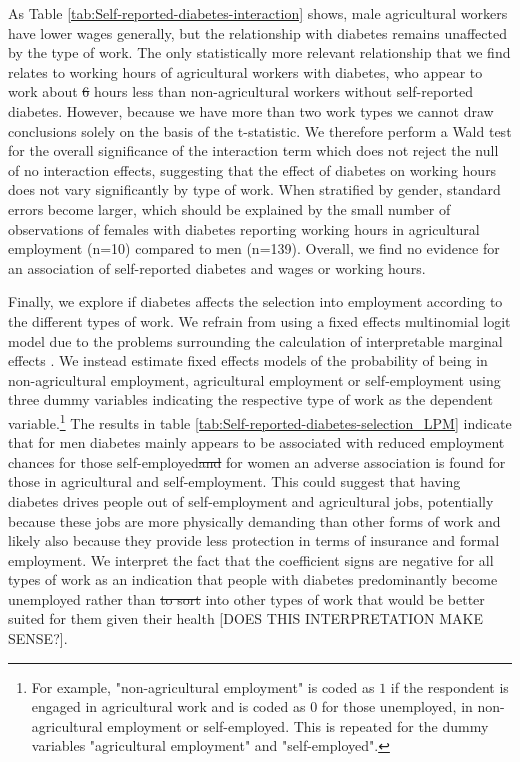 \documentclass[12pt,english,british]{article}
\providecommand{\DIFaddtex}[1]{{\protect\color{blue}\uwave{#1}}} %
\providecommand{\DIFdeltex}[1]{{\protect\color{red}\sout{#1}}}                      %
\providecommand{\DIFaddbegin}{} %
\providecommand{\DIFaddend}{} %
\providecommand{\DIFdelbegin}{} %
\providecommand{\DIFdelend}{} %
\providecommand{\DIFadd}[1]{\texorpdfstring{\DIFaddtex{#1}}{#1}} %
\providecommand{\DIFdel}[1]{\texorpdfstring{\DIFdeltex{#1}}{}} %
\begin{document}
As Table \ref{tab:Self-reported-diabetes-interaction} shows, male
agricultural workers have lower wages generally, but the relationship
with diabetes remains unaffected by the type of work. The only
statistically more relevant relationship that we find relates to working
hours of agricultural workers with diabetes, who appear to work about
\DIFdelbegin \DIFdel{6 }\DIFdelend \DIFaddbegin \DIFadd{five }\DIFaddend hours less than non-agricultural workers without self-reported diabetes.
However, because we have more than two work types we cannot draw conclusions
solely on the basis of the t-statistic. We therefore perform a Wald
test for the overall significance of the interaction term which does
not reject the null of no interaction effects, suggesting that the
effect of diabetes on working hours does not vary significantly by type of work.
When stratified by gender, standard errors become larger, which should
be explained by the small number of observations of females with diabetes
reporting working hours in agricultural employment (n=10) compared
to men (n=139). Overall, we find no evidence for an association of
self-reported diabetes and wages or working hours.

Finally, we explore if diabetes affects the selection into employment according to the different types of work. We refrain from using a fixed effects multinomial logit model due to the problems surrounding the calculation of interpretable marginal effects \citep{Pforr2014}. We instead estimate fixed effects models of the probability of being in non-agricultural employment, agricultural employment or self-employment using three dummy variables indicating the respective type of work as the dependent variable.\footnote{For example, "non-agricultural employment" is coded as $1$ if the respondent is engaged in agricultural work and is coded as $0$ for those unemployed, in non-agricultural employment or self-employed. This is repeated for the dummy variables "agricultural employment" and "self-employed".} The results in table \ref{tab:Self-reported-diabetes-selection_LPM} indicate that for men diabetes mainly appears to be associated with reduced employment chances for those self-employed\DIFdelbegin \DIFdel{and }\DIFdelend \DIFaddbegin \DIFadd{, while }\DIFaddend for women an adverse association is found for those in agricultural and self-employment. This could suggest that having diabetes drives people out of self-employment and agricultural jobs, potentially because these jobs are more physically demanding than other forms of work and likely also because they provide less protection in terms of insurance and formal employment. We interpret the fact that the coefficient signs are negative for all types of work as an indication that people with diabetes predominantly become unemployed rather than \DIFdelbegin \DIFdel{to sort }\DIFdelend \DIFaddbegin \DIFadd{sorting }\DIFaddend into other types of work that would be better suited for them given their health \DIFaddbegin \DIFadd{status}\DIFaddend [DOES THIS INTERPRETATION MAKE SENSE?].
\end{document}
